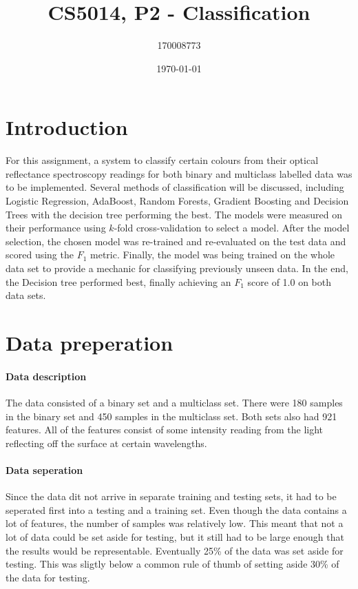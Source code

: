 \documentclass[british]{article}
\title{CS5014, P2 - Classification}
\author{170008773}
\date{\today}
\begin{document}
	\maketitle
	
	\section{Introduction}
	\label{intro}
	For this assignment, a system to classify certain colours from their optical reflectance spectroscopy readings for both binary and multiclass labelled data was to be implemented. Several methods of classification will be discussed, including Logistic Regression, AdaBoost, Random Forests, Gradient Boosting and Decision Trees with the decision tree performing the best. The models were measured on their performance using $k$-fold cross-validation to select a model. After the model selection, the chosen model was re-trained and re-evaluated on the test data and scored using the $F_1$ metric. Finally, the model was being trained on the whole data set to provide a mechanic for classifying previously unseen data.  In the end, the Decision tree performed best, finally achieving an $F_1$ score of 1.0 on both data sets. 
	
	
	\section{Data preperation}
	\paragraph{Data description} The data consisted of a binary set and a multiclass set. There were 180 samples in the binary set and 450 samples in the multiclass set. Both sets also had 921 features. All of the features consist of some intensity reading from the light reflecting off the surface at certain wavelengths.   
	
	\paragraph{Data seperation} Since the data dit not arrive in separate training and testing sets, it had to be seperated first into a testing and a training set. Even though the data contains a lot of features, the number of samples was relatively low. This meant that not a lot of data could be set aside for testing, but it still had to be large enough that the results would be representable. Eventually 25\% of the data was set aside for testing. This was sligtly below a common rule of thumb of setting aside 30\% of the data for testing. 
	
\end{document}
